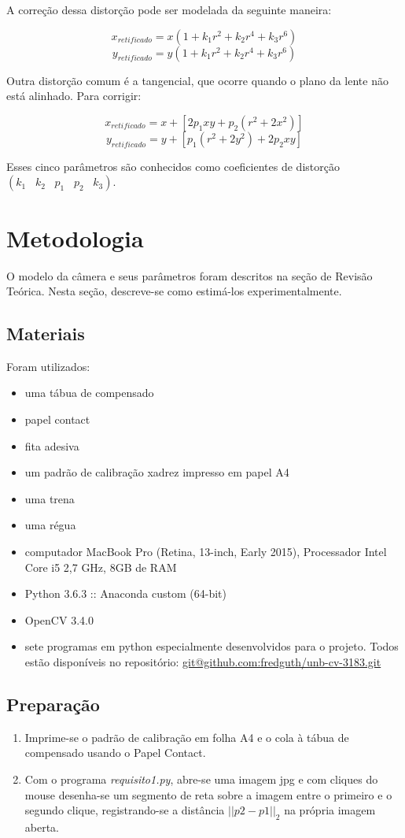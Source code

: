 \documentclass[conference]{IEEEtran}
\begin{document}
A correção dessa distorção pode ser modelada da seguinte maneira\cite{docsopencv}: 

    \[x_{retificado} = x( 1 + k_1 r^2 + k_2 r^4 + k_3 r^6)\]
    \[y_{retificado} = y( 1 + k_1 r^2 + k_2 r^4 + k_3 r^6)\]

Outra distorção comum é a tangencial, que ocorre quando o plano da lente não está alinhado. Para corrigir:


\[x_{retificado} = x + [ 2p_1xy + p_2(r^2+2x^2)] \]
\[y_{retificado} = y + [ p_1(r^2+ 2y^2)+ 2p_2xy] \]


Esses cinco parâmetros são conhecidos como coeficientes de distorção
\((k_1 \hspace{10pt} k_2 \hspace{10pt} p_1 \hspace{10pt} p_2 \hspace{10pt} k_3)\)\cite{docsopencv}.

\section{Metodologia}\label{metodologia}
O modelo da câmera e seus parâmetros foram descritos na seção de Revisão Teórica. Nesta seção, descreve-se como estimá-los experimentalmente.

\subsection{Materiais}
Foram utilizados:
\begin{itemize}
\item uma tábua de compensado
\item papel contact
\item fita adesiva
\item um padrão de calibração xadrez impresso em papel A4
\item uma trena
\item uma régua
\item computador MacBook Pro (Retina, 13-inch, Early 2015), Processador Intel Core i5 2,7 GHz, 8GB de RAM
\item Python 3.6.3 :: Anaconda custom (64-bit)
\item OpenCV 3.4.0
\item sete programas em python especialmente desenvolvidos para o projeto. Todos estão disponíveis no repositório: \url{git@github.com:fredguth/unb-cv-3183.git}\label{repo}
\end{itemize}

\subsection{Preparação}
 \begin{enumerate}
 \item Imprime-se o padrão de calibração em folha A4 e o cola à tábua de compensado usando o Papel Contact.
 \item Com o programa \textit{requisito1.py}, abre-se uma imagem jpg e com cliques do mouse desenha-se um segmento de reta sobre a imagem entre o primeiro e o segundo clique, registrando-se a distância \(||p2 - p1||_2 \) na própria imagem aberta. 
 \end{enumerate}
\end{document}
